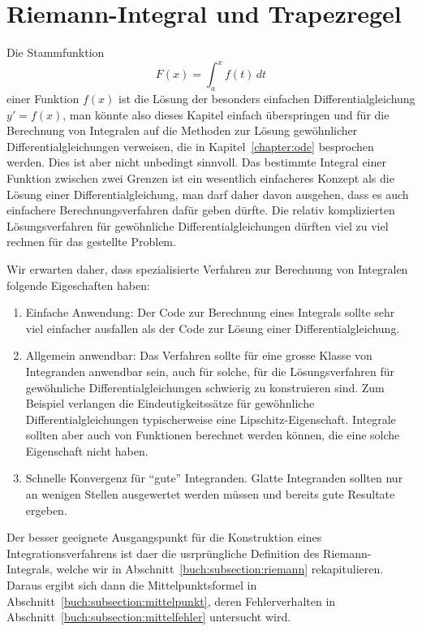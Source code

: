 %
%
%
\section{Riemann-Integral und Trapezregel
\label{buch:section:integraldefinition}}
%
%
Die Stammfunktion 
%
\[
F(x) =  \int_a^x f(t)\,dt
\]
einer Funktion $f(x)$ ist die Lösung der besonders einfachen
Differentialgleichung $y'=f(x)$, man könnte also dieses Kapitel
einfach überspringen und für die Berechnung von Integralen auf
die Methoden zur Lösung gewöhnlicher Differentialgleichungen
verweisen, die in Kapitel~\ref{chapter:ode} besprochen werden.
%
Dies ist aber nicht unbedingt sinnvoll.
Das bestimmte Integral einer Funktion zwischen zwei
Grenzen ist ein wesentlich einfacheres Konzept als die Lösung einer
Differentialgleichung, man darf daher davon ausgehen, dass es
auch einfachere Berechnungsverfahren dafür geben dürfte.
Die relativ komplizierten Lösungsverfahren für gewöhnliche
Differentialgleichungen dürften viel zu viel rechnen für das gestellte Problem.

Wir erwarten daher, dass spezialisierte Verfahren zur Berechnung von
Integralen folgende Eigeschaften haben:
\begin{enumerate}
\item Einfache Anwendung: Der Code zur Berechnung eines Integrals
sollte sehr viel einfacher ausfallen als der Code zur Lösung einer
Differentialgleichung.
\item Allgemein anwendbar: Das Verfahren sollte für eine grosse Klasse
von Integranden anwendbar sein, auch für solche, für die Lösungsverfahren
für gewöhnliche Differentialgleichungen schwierig zu konstruieren sind.
Zum Beispiel verlangen die Eindeutigkeitssätze für gewöhnliche
Differentialgleichungen typischerweise eine Lipschitz-Eigenschaft.
%
Integrale sollten aber auch von Funktionen berechnet werden können, die
eine solche Eigenschaft nicht haben.
\item Schnelle Konvergenz für ``gute'' Integranden.
Glatte Integranden sollten nur an wenigen Stellen ausgewertet werden müssen
und bereits gute Resultate ergeben.
\end{enumerate}
Der besser geeignete Ausgangspunkt für die Konstruktion eines 
Integrationsverfahrens ist daer die usrprüngliche Definition des
Riemann-Integrals, welche wir in Abschnitt~\ref{buch:subsection:riemann}
rekapitulieren.
%
Daraus ergibt sich dann die Mittelpunktsformel in
Abschnitt~\ref{buch:subsection:mittelpunkt}, deren Fehlerverhalten in
Abschnitt~\ref{buch:subsection:mittelfehler} untersucht wird.
%

